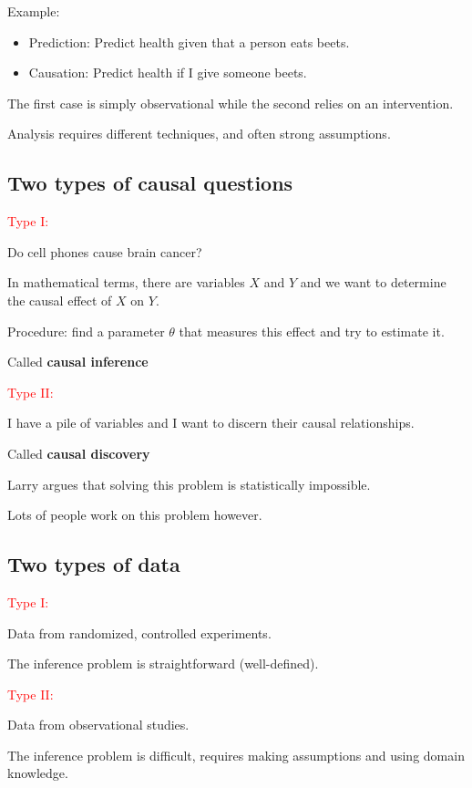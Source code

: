 \documentclass[]{article}
\providecommand{\tightlist}{%
  \setlength{\itemsep}{0pt}\setlength{\parskip}{0pt}}
\renewcommand{\sout}[1]{\textcolor{red}{#1}}
\begin{document}
Example:

\begin{itemize}
\tightlist
\item
  Prediction: Predict health given that a person eats beets.
\item
  Causation: Predict health if I give someone beets.
\end{itemize}

The first case is simply observational while the second relies on an
intervention.

Analysis requires different techniques, and often strong assumptions.

\hypertarget{two-types-of-causal-questions}{%
\subsection{Two types of causal
questions}\label{two-types-of-causal-questions}}

\sout{Type I:}

Do cell phones cause brain cancer?

In mathematical terms, there are variables \(X\) and \(Y\) and we want
to determine the causal effect of \(X\) on \(Y\).

Procedure: find a parameter \(\theta\) that measures this effect and try
to estimate it.

Called \textbf{causal inference}

\sout{Type II:}

I have a pile of variables and I want to discern their causal
relationships.

Called \textbf{causal discovery}

Larry argues that solving this problem is statistically impossible.

Lots of people work on this problem however.

\hypertarget{two-types-of-data}{%
\subsection{Two types of data}\label{two-types-of-data}}

\sout{Type I:}

Data from randomized, controlled experiments.

The inference problem is straightforward (well-defined).

\sout{Type II:}

Data from observational studies.

The inference problem is difficult, requires making assumptions and
using domain knowledge.
\end{document}
